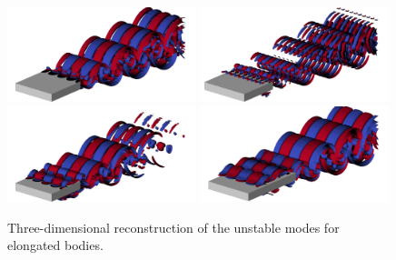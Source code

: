 \begin{figure}
  \centering
  \includegraphics[width=0.49\textwidth]{./fig/AR5s/Floqetmode_beta_2_Re550_AR5p5_A.png}
  \includegraphics[width=0.49\textwidth]{./fig/AR5s/Floqetmode_beta_4p75_Re550_AR5p5_Ap.png}
  \includegraphics[width=0.49\textwidth]{./fig/AR5s/Floqetmode_beta_2_Re550_AR5p5_QS.png}   
  \includegraphics[width=0.49\textwidth]{./fig/AR9s/Floquet_AR9_Re450_beta2_modeQS.png}
  \caption{Three-dimensional reconstruction of the unstable modes for elongated bodies.}
  \label{fig:modes_long}
\end{figure}


